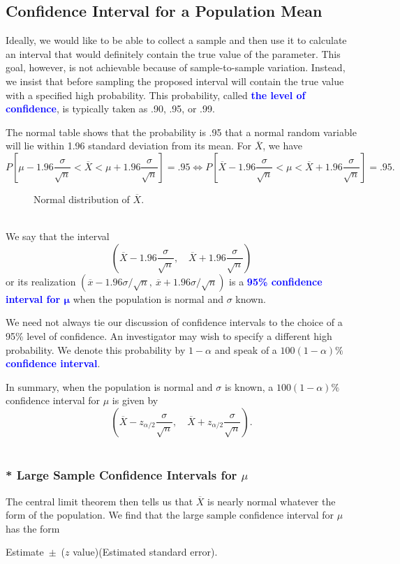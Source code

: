 \documentclass[12pt,openany]{book}
\theoremstyle{definition}
\begin{document}
	\subsection{Confidence Interval for a Population Mean}
	Ideally, we would like to be able to collect a sample and then use it to calculate an interval that would definitely contain the true value of the parameter. This goal, however, is not achievable because of sample-to-sample variation. Instead, we insist that before sampling the proposed interval will contain the true
	value with a specified high probability. This probability, called \textcolor{blue}{\bf the level of confidence}, is typically taken as .90, .95, or .99.\par
	The normal table shows that the probability is .95 that a normal random variable will lie within 1.96 standard deviation from its mean. For $\overline{X}$, we have \[
	P\left[\mu-1.96\frac{\sigma}{\sqrt{n}}<\overline{X}<\mu+1.96\frac{\sigma}{\sqrt{n}}\right] = .95
	\iff P\left[\overline{X}-1.96\frac{\sigma}{\sqrt{n}}<\mu<\overline{X}+1.96\frac{\sigma}{\sqrt{n}}\right] = .95.
	\]
	\begin{figure}[h!]
		\centering
		\caption{Normal distribution of $\overline{X}$.}
	\end{figure}\
	\\
	We say that the interval \[
	\left(\overline{X}-1.96\frac{\sigma}{\sqrt{n}},\quad \overline{X}+1.96\frac{\sigma}{\sqrt{n}}\right)
	\] or its realization $\left(\overline{x}-1.96\sigma/\sqrt{n},\ \overline{x}+1.96\sigma/\sqrt{n} \right)$ is a \textcolor{blue}{\bf 95\% confidence interval for $\boldsymbol{\mu}$} when the population is normal and $\sigma$ known. \par
	We need not always tie our discussion of confidence intervals to the choice of a 95\% level of confidence. An investigator may wish to specify a different high probability. We denote this probability by $1-\alpha$ and speak of a $100(1-\alpha)\%$ \textcolor{blue}{\bf confidence interval}.\par
	In summary, when the population is normal and $\sigma$ is known, a $100(1-\alpha)\%$ confidence interval for $\mu$ is given by \[
	\left(\overline{X}-z_{\alpha/2}\frac{\sigma}{\sqrt{n}},\quad\overline{X}+z_{\alpha/2}\frac{\sigma}{\sqrt{n}} \right).
	\]
	\\
	\subsubsection*{* Large Sample Confidence Intervals for $\mu$}
	The central limit theorem then tells us that $\overline{X}$ is nearly normal whatever the form of the
	population. We find that the large sample confidence interval for $\mu$ has the form \begin{center}
		Estimate\ $\pm$\ ($z$ value)(Estimated standard error).
	\end{center}
	
\end{document}
